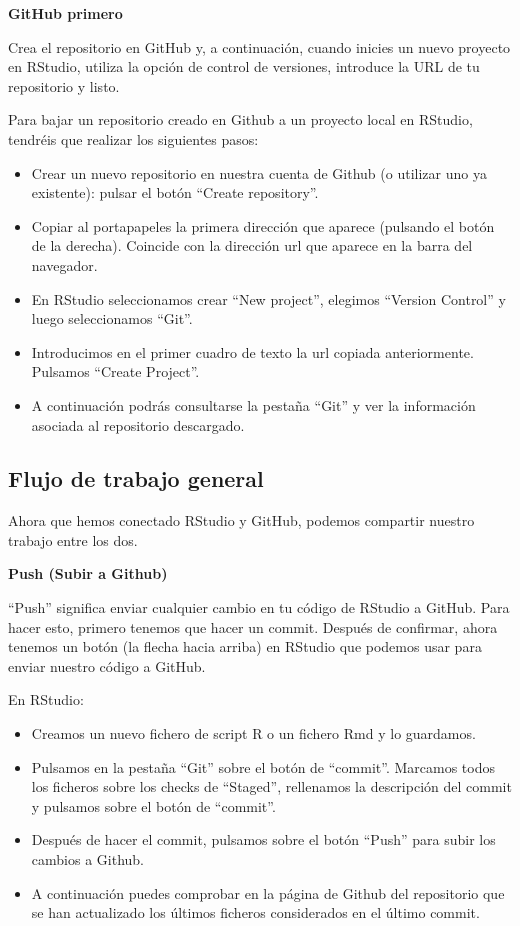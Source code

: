 \documentclass[
  letterpaper,
  DIV=11,
  numbers=noendperiod]{scrreprt}
\begin{document}
\textbf{GitHub primero}

Crea el repositorio en GitHub y, a continuación, cuando inicies un nuevo
proyecto en RStudio, utiliza la opción de control de versiones,
introduce la URL de tu repositorio y listo.

Para bajar un repositorio creado en Github a un proyecto local en
RStudio, tendréis que realizar los siguientes pasos:

\begin{itemize}
\item
  Crear un nuevo repositorio en nuestra cuenta de Github (o utilizar uno
  ya existente): pulsar el botón ``Create repository''.
\item
  Copiar al portapapeles la primera dirección que aparece (pulsando el
  botón de la derecha). Coincide con la dirección url que aparece en la
  barra del navegador.
\item
  En RStudio seleccionamos crear ``New project'', elegimos ``Version
  Control'' y luego seleccionamos ``Git''.
\item
  Introducimos en el primer cuadro de texto la url copiada
  anteriormente. Pulsamos ``Create Project''.
\item
  A continuación podrás consultarse la pestaña ``Git'' y ver la
  información asociada al repositorio descargado.
\end{itemize}

\subsection{Flujo de trabajo general}\label{flujo-de-trabajo-general}

Ahora que hemos conectado RStudio y GitHub, podemos compartir nuestro
trabajo entre los dos.

\textbf{Push (Subir a Github)}

``Push'' significa enviar cualquier cambio en tu código de RStudio a
GitHub. Para hacer esto, primero tenemos que hacer un commit. Después de
confirmar, ahora tenemos un botón (la flecha hacia arriba) en RStudio
que podemos usar para enviar nuestro código a GitHub.

En RStudio:

\begin{itemize}
\item
  Creamos un nuevo fichero de script R o un fichero Rmd y lo guardamos.
\item
  Pulsamos en la pestaña ``Git'' sobre el botón de ``commit''. Marcamos
  todos los ficheros sobre los checks de ``Staged'', rellenamos la
  descripción del commit y pulsamos sobre el botón de ``commit''.
\item
  Después de hacer el commit, pulsamos sobre el botón ``Push'' para
  subir los cambios a Github.
\item
  A continuación puedes comprobar en la página de Github del repositorio
  que se han actualizado los últimos ficheros considerados en el último
  commit.
\end{itemize}
\end{document}
